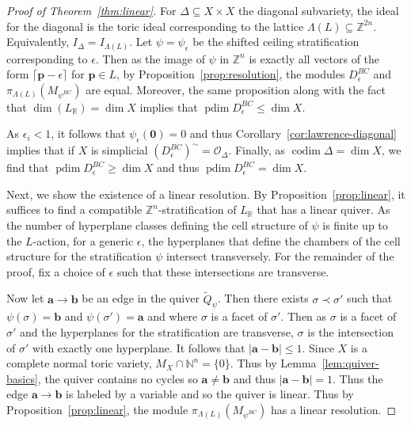 \documentclass{amsart}
\newcommand{\cO}{\mathcal O}
\newcommand{\NN}{\mathbb{N}}
\newcommand{\ZZ}{\mathbb{Z}}
\newcommand{\RR}{\mathbb{R}}
\newcommand{\Mepsilon}{D^{BC}_{\epsilon}}
\DeclareMathOperator{\codim}{codim}
\DeclareMathOperator{\pdim}{pdim}
\theoremstyle{remark}
\begin{document}
\begin{proof}[Proof of Theorem~\ref{thm:linear}]
  For $\Delta\subseteq X\times X$ the diagonal subvariety,
  the ideal for the diagonal is the toric ideal corresponding to the lattice
  $\Lambda(L)\subseteq \ZZ^{2n}$. Equivalently, $I_\Delta = I_{\Lambda(L)}$.
  Let $\psi = \psi_\epsilon$ be the shifted ceiling stratification corresponding to $\epsilon$.
  Then as the image of $\psi$ in $\ZZ^n$ is exactly all vectors of the form
  $\lceil\bm{p}-\epsilon\rceil$ for $\bm{p}\in L$, by Proposition~\ref{prop:resolution},
  the modules $\Mepsilon$ and $\pi_{\Lambda(L)}(M_{\psi^{BC}})$ are equal.
  Moreover, the same proposition along with the fact that $\dim (L_{\RR}) = \dim X$
  implies that $\pdim \Mepsilon \leq \dim X$.

  As $\epsilon_i<1$, it follows that $\psi_{\epsilon}(\bm{0}) = 0$ and thus
  Corollary~\ref{cor:lawrence-diagonal} implies that if $X$ is simplicial $(\Mepsilon)^{\sim} = \cO_\Delta$.
  Finally, as $\codim \Delta=\dim X$, we find that $\pdim \Mepsilon \geq \dim X$
  and thus $\pdim \Mepsilon = \dim X$.

  Next, we show the existence of a linear resolution.
  By Proposition~\ref{prop:linear}, it suffices to find a compatible $\ZZ^n$-stratification
  of $L_{\RR}$ that has a linear quiver. As the number of hyperplane classes defining
  the cell structure of $\psi$ is finite up to the $L$-action, for a generic $\epsilon$,
  the hyperplanes that define the chambers of the cell structure
  for the stratification $\psi$ intersect transversely. For the remainder of the proof,
  fix a choice of $\epsilon$ such that these intersections are transverse.

  Now let $\bm{a}\rightarrow \bm{b}$ be an edge in the quiver $\widetilde{Q}_{\psi}$. Then there exists $\sigma\prec \sigma'$ such that $\psi(\sigma)=\bm{b}$ and $\psi(\sigma')=\bm{a}$ and where $\sigma$ is a facet of $\sigma'$. Then as $\sigma$ is a facet of $\sigma'$ and the hyperplanes for the stratification are transverse, $\sigma$ is the intersection of $\sigma'$ with exactly one hyperplane. It follows that $|\bm{a}-\bm{b}|\leq 1$. Since $X$ is a complete normal toric variety, $M_X\cap \NN^{n}=\{0\}$. Thus by Lemma~\ref{lem:quiver-basics}, the quiver contains no cycles so $\bm{a}\neq \bm{b}$ and thus $|\bm{a}-\bm{b}|=1$. Thus the edge $\bm{a}\rightarrow \bm{b}$ is labeled by a variable and so the quiver is linear. Thus by Proposition~\ref{prop:linear}, the module $\pi_{\Lambda(L)}(M_{\psi^{BC}})$ has a linear resolution.
\end{proof}
\end{document}
